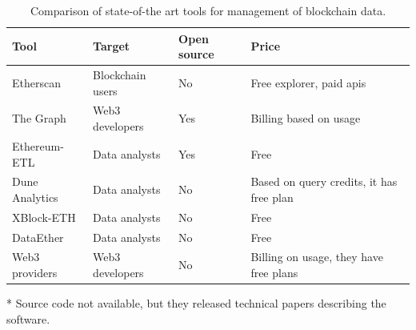 \begin{table}[ht!]
\centering
    \begin{threeparttable}
    \begin{tabular}  { m{3cm} m{3cm} m{1.5cm} m{5cm} } 
    \toprule
    \textbf{Tool} & \textbf{Target} & \textbf{Open source} & \textbf{Price}  \\
    \midrule
    Etherscan    & Blockchain users  & No & Free explorer, paid apis  \\[2.3ex]
    The Graph     & Web3 developers & Yes & Billing based on usage  \\[1.3ex]
    Ethereum-ETL     & Data analysts & Yes & Free  \\[1.3ex]
    Dune Analytics      & Data analysts & No & Based on query credits, it has free plan \\[2.6ex]
    XBlock-ETH  & Data analysts & No\tnote{*} & Free   \\[1.3ex]
    DataEther  & Data analysts & No\tnote{*} & Free   \\[1.3ex]
    Web3 providers      & Web3 developers & No & Billing on usage, they have free plans   \\[1.6ex]
    \bottomrule
    \end{tabular}
    \begin{tablenotes}
      \item[*] Source code not available, but they released technical papers describing the software.
      \end{tablenotes}
    \end{threeparttable}
\caption[State of the art tools comparison]{Comparison of state-of-the art tools for management of blockchain data.}
\label{table:tools-comparison}
\end{table}
